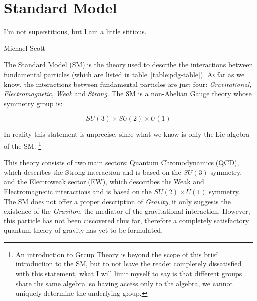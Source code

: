 
\chapter{Standard Model}

\epigraph{I'm not superstitious, but I am a little stitious.}{Michael Scott}


The Standard Model (SM) is the theory used to describe the interactions between fundamental particles 
(which are listed in table~\ref{table:pdg-table}).
As far as we know, the interactions between fundamental particles are just four: \textit{Gravitational}, 
\textit{Electromagnetic}, \textit{Weak} and \textit{Strong}.
The SM is a non-Abelian Gauge theory whose symmetry group is:

\begin{equation}
    SU(3) \times SU(2) \times U(1)
\end{equation}

In reality this statement is unprecise, since what we know is only the Lie algebra of the SM.%
\footnote{
    An introduction to Group Theory is beyond the scope of this brief introduction to the SM, 
    but to not leave the reader completely dissatisfied with this statement, 
    what I will limit myself to say is that different groups share the same algebra, so having access only 
    to the algebra, we cannot uniquely determine the underlying group.}

This theory consists of two main sectors: Quantum Chromodynamics (QCD), which describes the Strong interaction 
and is based on the $SU(3)$ symmetry, and the Electroweak sector (EW), which desccribes the Weak 
and Electromagnetic interactions and is based on the $SU(2) \times U(1)$ symmetry.\\
The SM does not offer a proper description of \textit{Gravity}, it only suggests the existence of 
the \textit{Graviton}, the mediator of the gravitational interaction.
However, this particle has not been discovered thus far,  therefore a completely satisfactory quantum 
theory of gravity has yet to be formulated.\\

